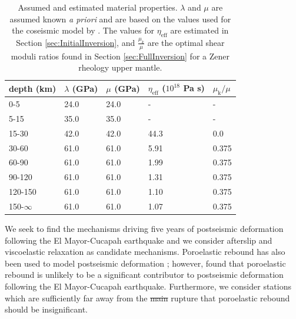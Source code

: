 \documentclass[draft,linenumbers]{AGUJournal}
\providecommand{\DIFdel}[1]{{\protect\color{red}\sout{#1}}}                      %
\providecommand{\DIFaddbegin}{} %
\providecommand{\DIFaddend}{} %
\providecommand{\DIFdelbegin}{} %
\providecommand{\DIFdelend}{} %
\providecommand{\DIFdelbeginFL}{} %
\providecommand{\DIFdelendFL}{} %
\begin{document}
\begin{table}\label{tab:MaterialProperties}
\begin{tabular} {l l l l l}
depth (km) &$\lambda$ (GPa)&$\mu$ (GPa)&$\eta_\mathrm{eff}$ ($10^{18}$ Pa s) & $\mu_\mathrm{k}/\mu$\\ \hline
0-5 & 24.0 & 24.0 & - & -\\
5-15 & 35.0 & 35.0 & - & -\\
15-30 & 42.0 & 42.0 & 44.3 & 0.0\\
30-60 & 61.0 & 61.0 & 5.91 & 0.375\\
60-90 & 61.0 & 61.0 & 1.99 & 0.375\\
90-120 & 61.0 & 61.0 & 1.31 & 0.375\\
120-150 & 61.0 & 61.0 & 1.10 & 0.375\\
150-$\infty$ & 61.0 & 61.0 & 1.07 & 0.375\\
\end{tabular}
\caption{Assumed and estimated material properties. $\lambda$ and $\mu$ are assumed known \textit{a priori} and are based on the values used for the coseismic model by \citet{Wei2011}.  The values for $\eta_\mathrm{eff}$ are estimated in Section \ref{sec:InitialInversion}, and $\frac{\mu_k}{\mu}$ are the optimal shear moduli ratios found in Section \ref{sec:FullInversion} for a Zener rheology upper mantle.} 
\DIFdelbeginFL %

\DIFdelendFL \end{table}
\DIFaddbegin 

\DIFaddend We seek to find the mechanisms driving five years of postseismic deformation following the El Mayor-Cucapah earthquake and we consider afterslip and viscoelastic relaxation as candidate mechanisms.  Poroelastic rebound has also been used to model postseismic deformation \citep[e.g.][]{Jonsson2003}; however, \citet{Gonzalez-ortega2014} found that poroelastic rebound is unlikely to be a significant contributor to postseismic deformation following the El Mayor-Cucapah earthquake. Furthermore, we consider stations which are sufficiently far away from the \DIFdelbegin \DIFdel{main }\DIFdelend rupture that poroelastic rebound should be insignificant.  
\end{document}
